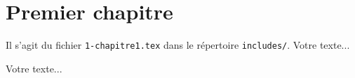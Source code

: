 
\newpage

\section{Premier chapitre}

Il s'agit du fichier \texttt{1-chapitre1.tex} dans le répertoire \texttt{includes/}. Votre texte...

Votre texte...
